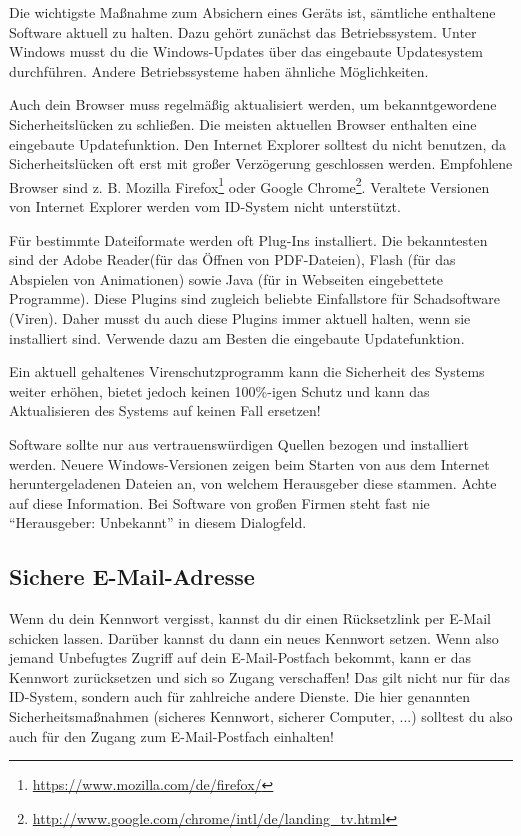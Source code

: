 Die wichtigste Maßnahme zum Absichern eines Geräts ist, sämtliche enthaltene Software aktuell zu halten.
Dazu gehört zunächst das Betriebssystem.
Unter Windows musst du die Windows-Updates über das eingebaute Updatesystem durchführen. Andere Betriebssysteme haben ähnliche Möglichkeiten.

Auch dein Browser muss regelmäßig aktualisiert werden, um bekanntgewordene Sicherheitslücken zu schließen.
Die meisten aktuellen Browser enthalten eine eingebaute Updatefunktion.
Den Internet Explorer solltest du nicht benutzen, da Sicherheitslücken oft erst mit großer Verzögerung geschlossen werden.
Empfohlene Browser sind z. B. Mozilla Firefox\footnote{\url{https://www.mozilla.com/de/firefox/}}
oder Google Chrome\footnote{\url{http://www.google.com/chrome/intl/de/landing_tv.html}}.
Veraltete Versionen von Internet Explorer werden vom ID-System nicht unterstützt.

Für bestimmte Dateiformate werden oft Plug-Ins installiert.
Die bekanntesten sind der Adobe Reader(für das Öffnen von PDF-Dateien),
Flash (für das Abspielen von Animationen) sowie
Java (für in Webseiten eingebettete Programme).
Diese Plugins sind zugleich beliebte Einfallstore für Schadsoftware (Viren).
Daher musst du auch diese Plugins immer aktuell halten, wenn sie installiert sind.
Verwende dazu am Besten die eingebaute Updatefunktion.

Ein aktuell gehaltenes Virenschutzprogramm kann die Sicherheit des Systems weiter erhöhen,
bietet jedoch keinen 100\%-igen Schutz und kann das Aktualisieren des Systems auf keinen Fall ersetzen!

Software sollte nur aus vertrauenswürdigen Quellen bezogen und installiert werden.
Neuere Windows-Versionen zeigen beim Starten von aus dem Internet heruntergeladenen Dateien an, von welchem Herausgeber diese stammen.
Achte auf diese Information. Bei Software von großen Firmen steht fast nie "`Herausgeber: Unbekannt"' in diesem Dialogfeld.

\subsection{Sichere E-Mail-Adresse}
Wenn du dein Kennwort vergisst, kannst du dir einen Rücksetzlink per E-Mail schicken lassen.
Darüber kannst du dann ein neues Kennwort setzen.
Wenn also jemand Unbefugtes Zugriff auf dein E-Mail-Postfach bekommt,
kann er das Kennwort zurücksetzen und sich so Zugang verschaffen!
Das gilt nicht nur für das ID-System, sondern auch für zahlreiche andere Dienste.
Die hier genannten Sicherheitsmaßnahmen (sicheres Kennwort, sicherer Computer, ...) solltest du also auch für den Zugang zum E-Mail-Postfach einhalten!


